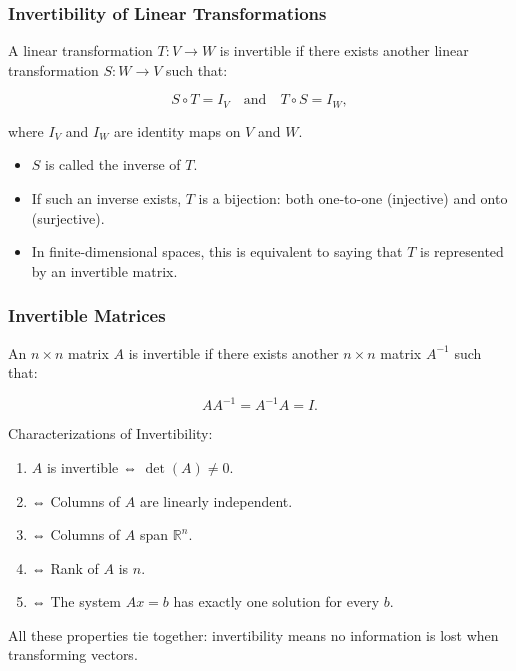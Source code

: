 \documentclass[
  letterpaper,
  DIV=11,
  numbers=noendperiod]{scrreprt}
\providecommand{\tightlist}{%
  \setlength{\itemsep}{0pt}\setlength{\parskip}{0pt}}
\begin{document}
\subsubsection{Invertibility of Linear
Transformations}\label{invertibility-of-linear-transformations}

A linear transformation \(T: V \to W\) is invertible if there exists
another linear transformation \(S: W \to V\) such that:

\[
S \circ T = I_V \quad \text{and} \quad T \circ S = I_W,
\]

where \(I_V\) and \(I_W\) are identity maps on \(V\) and \(W\).

\begin{itemize}
\tightlist
\item
  \(S\) is called the inverse of \(T\).
\item
  If such an inverse exists, \(T\) is a bijection: both one-to-one
  (injective) and onto (surjective).
\item
  In finite-dimensional spaces, this is equivalent to saying that \(T\)
  is represented by an invertible matrix.
\end{itemize}

\subsubsection{Invertible Matrices}\label{invertible-matrices}

An \(n \times n\) matrix \(A\) is invertible if there exists another
\(n \times n\) matrix \(A^{-1}\) such that:

\[
AA^{-1} = A^{-1}A = I.
\]

Characterizations of Invertibility:

\begin{enumerate}
\def\labelenumi{\arabic{enumi}.}
\tightlist
\item
  \(A\) is invertible ⇔ \(\det(A) \neq 0\).
\item
  ⇔ Columns of \(A\) are linearly independent.
\item
  ⇔ Columns of \(A\) span \(\mathbb{R}^n\).
\item
  ⇔ Rank of \(A\) is \(n\).
\item
  ⇔ The system \(Ax=b\) has exactly one solution for every \(b\).
\end{enumerate}

All these properties tie together: invertibility means no information is
lost when transforming vectors.
\end{document}
